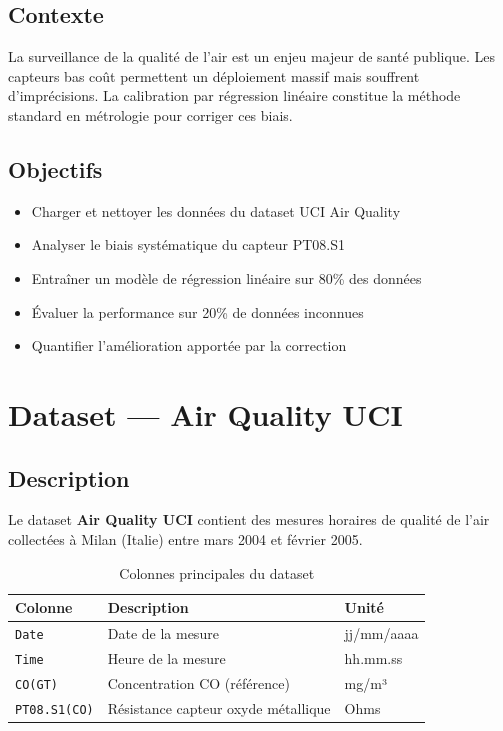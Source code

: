 \documentclass[12pt, a4paper]{article}
\begin{document}
\subsection{Contexte}
La surveillance de la qualité de l'air est un enjeu majeur de santé publique. Les capteurs 
bas coût permettent un déploiement massif mais souffrent d'imprécisions. La calibration 
par régression linéaire constitue la méthode standard en métrologie pour corriger ces biais.

\subsection{Objectifs}
\begin{itemize}
    \item Charger et nettoyer les données du dataset UCI Air Quality
    \item Analyser le biais systématique du capteur PT08.S1
    \item Entraîner un modèle de régression linéaire sur 80\% des données
    \item Évaluer la performance sur 20\% de données inconnues
    \item Quantifier l'amélioration apportée par la correction
\end{itemize}

\section{Dataset — Air Quality UCI}

\subsection{Description}
Le dataset \textbf{Air Quality UCI} contient des mesures horaires de qualité de l'air 
collectées à Milan (Italie) entre mars 2004 et février 2005.

\begin{table}[H]
    \centering
    \caption{Colonnes principales du dataset}
    \begin{tabular}{@{}lll@{}}
        \toprule
        \textbf{Colonne} & \textbf{Description} & \textbf{Unité} \\
        \midrule
        \texttt{Date} & Date de la mesure & jj/mm/aaaa \\
        \texttt{Time} & Heure de la mesure & hh.mm.ss \\
        \texttt{CO(GT)} & Concentration CO (référence) & mg/m³ \\
        \texttt{PT08.S1(CO)} & Résistance capteur oxyde métallique & Ohms \\
        \bottomrule
    \end{tabular}
\end{table}
\end{document}
